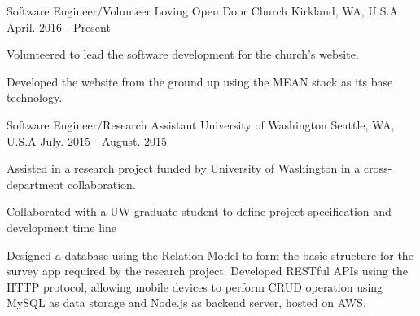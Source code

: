 


\begin{cventries}


  \cventry
      {Software Engineer/Volunteer} %
      {Loving Open Door Church } %
      {Kirkland, WA, U.S.A} %
      {April. 2016 - Present} %
      { %
        \begin{cvitems}
        \item {Volunteered to lead the software development for the church's website.}
        \item {Developed the website from the ground up using the MEAN stack as its base technology.}
        \end{cvitems}
      }
  
  \cventry
  	{Software Engineer/Research Assistant}
  	{University of Washington}
  	{Seattle, WA, U.S.A}
  	{July. 2015 - August. 2015}
  	      { %
        \begin{cvitems}
        \item {Assisted in a research project funded by University of Washington in a cross-department collaboration.}
         \item{Collaborated with a UW graduate student to define project specification and development time line}
        \item {Designed a database using the Relation Model to form the basic structure for the survey app required by the research project. Developed RESTful APIs using the HTTP protocol, allowing mobile devices to perform CRUD operation using MySQL as data storage and Node.js as backend server, hosted on AWS.}
        \end{cvitems}
    }
  
    
\end{cventries}
